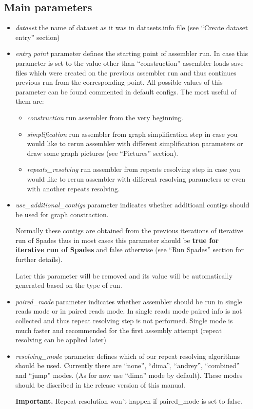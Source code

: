 \documentclass{article}
\begin{document}
\subsection{Main parameters}
\begin{itemize}
\item {\it dataset} the name of dataset as it was in datasets.info file (see ``Create dataset entry'' section)
\item {\it entry point} parameter defines the starting point of assembler run.
In case this parameter is set to the value other than ``construction'' assembler loads save files which were created on the previous assembler run and thus continues previous run from the corresponding point.
All possible values of this parameter can be found commented in default configs.
The most useful of them are:
\begin{itemize}
\item {\it construction} run assembler from the very beginning.
\item {\it simplification} run assembler from graph simplification step in case you would like to rerun assembler with different simplification parameters or draw some graph pictures (see ``Pictures'' section).
\item {\it repeats\_resolving} run assembler from repeats resolving step in case you would like to rerun assembler with different resolving parameters or even with another repeats resolving.
\end{itemize}
\item {\it use\_additional\_contigs} parameter indicates whether additioanl contigs should be used for graph constraction.

Normally these contigs are obtained from the previous iterations of iterative run of Spades thus 
in most cases this parameter should be \textbf{true for iterative run of Spades} 
and false otherwise (see ``Run Spades'' section for further details).

Later this parameter will be removed and its value will be automatically generated based on the type of run.
\item {\it paired\_mode} parameter indicates whether assembler should be run in single reads mode or in paired reads mode. 
In single reads mode paired info is not collected and thus repeat resolving step is not performed. Single mode is much faster and recommended
for the first assembly attempt (repeat resolving can be applied later)
\item {\it resolving\_mode} parameter defines which of our repeat resolving algorithms should be used.
Currently there are ``none'', ``dima'', ``andrey'', ``combined'' and ``jump'' modes. (As for now use ``dima'' mode by default).
These modes should be discribed in the release version of this manual. 

\textbf{Important.} Repeat resolution won't happen if paired\_mode is set to false.
\end{itemize}
\end{document}
